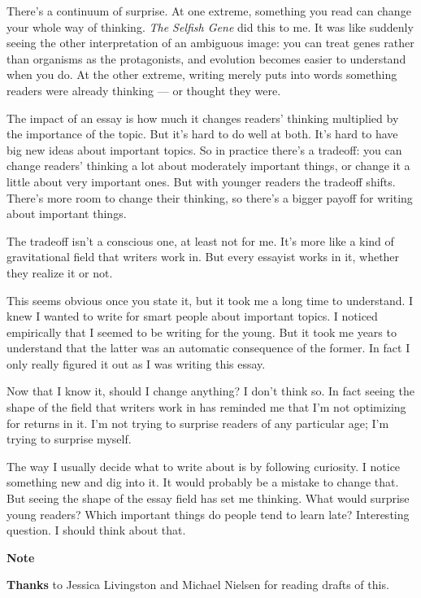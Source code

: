 There's a continuum of surprise. At one extreme, something you read can
change your whole way of thinking. \emph{The Selfish Gene} did this to
me. It was like suddenly seeing the other interpretation of an ambiguous
image: you can treat genes rather than organisms as the protagonists,
and evolution becomes easier to understand when you do. At the other
extreme, writing merely puts into words something readers were already
thinking --- or thought they were.

The impact of an essay is how much it changes readers' thinking
multiplied by the importance of the topic. But it's hard to do well at
both. It's hard to have big new ideas about important topics. So in
practice there's a tradeoff: you can change readers' thinking a lot
about moderately important things, or change it a little about very
important ones. But with younger readers the tradeoff shifts. There's
more room to change their thinking, so there's a bigger payoff for
writing about important things.

The tradeoff isn't a conscious one, at least not for me. It's more like
a kind of gravitational field that writers work in. But every essayist
works in it, whether they realize it or not.

This seems obvious once you state it, but it took me a long time to
understand. I knew I wanted to write for smart people about important
topics. I noticed empirically that I seemed to be writing for the young.
But it took me years to understand that the latter was an automatic
consequence of the former. In fact I only really figured it out as I was
writing this essay.

Now that I know it, should I change anything? I don't think so. In fact
seeing the shape of the field that writers work in has reminded me that
I'm not optimizing for returns in it. I'm not trying to surprise readers
of any particular age; I'm trying to surprise myself.

The way I usually decide what to write about is by following curiosity.
I notice something new and dig into it. It would probably be a mistake
to change that. But seeing the shape of the essay field has set me
thinking. What would surprise young readers? Which important things do
people tend to learn late? Interesting question. I should think about
that.

\textbf{Note}

\textbf{Thanks} to Jessica Livingston and Michael Nielsen for reading
drafts of this.